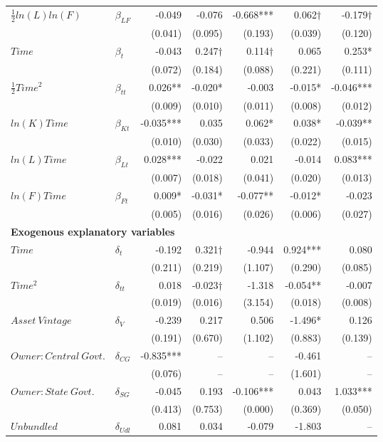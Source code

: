 \begin{table}[htbp]
\begin{adjustwidth}{-0cm}{0cm}
{\begin{tabular}{llrrrrr}
$\frac{1}{2}ln(L)ln(F)$ & $\beta_{LF}$  & -0.049  & -0.076  & -0.668*** & 0.062$\dag$ & -0.179$\dag$ \\
  & & (0.041) & (0.095) & (0.193) & (0.039) & (0.120) \\
$Time$ & $\beta_{t}$  & -0.043  & 0.247$\dag$ & 0.114$\dag$ & 0.065  & 0.253* \\
  & & (0.072) & (0.184) & (0.088) & (0.221) & (0.111) \\
$\frac{1}{2}Time^2$ & $\beta_{tt}$  & 0.026** & -0.020* & -0.003  & -0.015* & -0.046*** \\
  & & (0.009) & (0.010) & (0.011) & (0.008) & (0.012) \\
$ln(K)Time$ & $\beta_{Kt}$  & -0.035*** & 0.035  & 0.062* & 0.038* & -0.039** \\
  & & (0.010) & (0.030) & (0.033) & (0.022) & (0.015) \\
$ln(L)Time$ & $\beta_{Lt}$  & 0.028*** & -0.022  & 0.021  & -0.014  & 0.083*** \\
  & & (0.007) & (0.018) & (0.041) & (0.020) & (0.013) \\
$ln(F)Time$ & $\beta_{Ft}$  & 0.009* & -0.031* & -0.077** & -0.012* & -0.023  \\
  & & (0.005) & (0.016) & (0.026) & (0.006) & (0.027) \\
\midrule
\multicolumn{5}{l}{\textbf{Exogenous explanatory variables} } \\
\midrule   
$Time$ & $\delta_{t}$  & -0.192  & 0.321$\dag$ & -0.944  & 0.924*** & 0.080  \\
  & & (0.211) & (0.219) & (1.107) & (0.290) & (0.085) \\
$Time^2$ & $\delta_{tt}$  & 0.018  & -0.023$\dag$ & -1.318  & -0.054** & -0.007  \\
  & & (0.019) & (0.016) & (3.154) & (0.018) & (0.008) \\
$Asset~Vintage$ & $\delta_{V}$  & -0.239  & 0.217  & 0.506  & -1.496* & 0.126  \\
  & & (0.191) & (0.670) & (1.102) & (0.883) & (0.139) \\
$Owner:Central~Govt.$ & $\delta_{CG}$  & -0.835*** & -- & -- & -0.461  & -- \\
  & & (0.076) & -- & -- & (1.601) & -- \\
$Owner:State~Govt.$ & $\delta_{SG}$  & -0.045  & 0.193  & -0.106*** & 0.043  & 1.033*** \\
  & & (0.413) & (0.753) & (0.000) & (0.369) & (0.050) \\
$Unbundled$ & $\delta_{Udl}$  & 0.081  & 0.034  & -0.079  & -1.803  & --  \\

\end{tabular}}
\end{adjustwidth}
\end{table}
